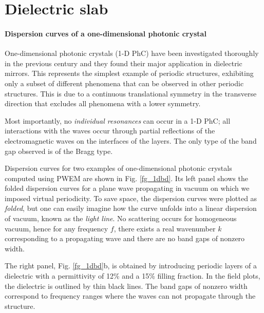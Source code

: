 \label{chapter_results}
\section{Dielectric slab} \label{section_Dielectric slab}%
\paragraph{Dispersion curves of a one-dimensional photonic crystal}%
One-dimensional photonic crystals (1-D PhC) have been investigated thoroughly in the previous century and they found their major application in dielectric mirrors. This represents the simplest example of periodic structures, exhibiting only a subset of different phenomena that can be observed in other periodic structures. This is due to a continuous translational symmetry in the transverse direction that excludes all phenomena with a lower symmetry. 

Most importantly, no \textit{individual resonances} can occur in a 1-D PhC; all interactions with the waves occur through partial reflections of the electromagnetic waves on the interfaces of the layers. The only type of the band gap observed is of the Bragg type.

Dispersion curves for two examples of one-dimensional photonic crystals computed using PWEM are shown in Fig. \ref{fg_1dbd}. 
Its left panel shows the folded dispersion curves for a plane wave propagating in vacuum on which we imposed virtual periodicity. To save space, the dispersion curves were plotted as \textit{folded}, but one can easily imagine how the curve unfolds into a linear dispersion of vacuum, known as the \textit{light line}. No scattering occurs for homogeneous vacuum, hence for any frequency $f$, there exists a real wavenumber $k$ corresponding to a propagating wave and there are no band gaps of nonzero width. 

The right panel, Fig. \ref{fg_1dbd}b, is obtained by introducing periodic layers of a dielectric with a permittivity of 12\% and a 15\% filling fraction. In the field plots, the dielectric is outlined by thin black lines. The band gaps of nonzero width correspond to frequency ranges where the waves can not propagate through the structure. %

